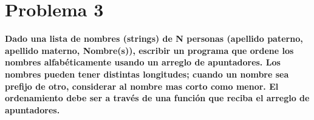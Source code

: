 \section*{Problema 3}

\textbf{Dado una lista de nombres (strings) de N personas (apellido paterno, apellido materno, Nombre(s)), escribir un programa que ordene los nombres alfabéticamente usando un arreglo de apuntadores. Los nombres pueden tener distintas longitudes; cuando un nombre sea prefijo de otro, considerar al nombre mas corto como menor. El ordenamiento debe ser a través de una función que reciba el arreglo de apuntadores.}